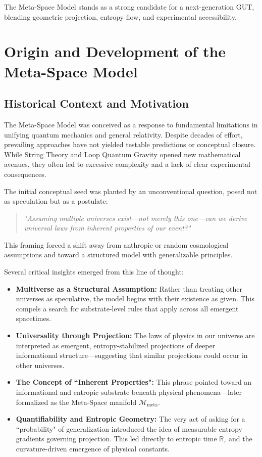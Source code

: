 \documentclass[10.5pt,a4paper]{article}
\begin{document}
The Meta-Space Model stands as a strong candidate for a next-generation GUT, blending geometric projection, entropy flow, and experimental accessibility.

\clearpage

\section{Origin and Development of the Meta-Space Model}
\subsection{Historical Context and Motivation}

The Meta-Space Model was conceived as a response to fundamental limitations in unifying quantum mechanics and general relativity. Despite decades of effort, prevailing approaches have not yielded testable predictions or conceptual closure. While String Theory and Loop Quantum Gravity opened new mathematical avenues, they often led to excessive complexity and a lack of clear experimental consequences.

The initial conceptual seed was planted by an unconventional question, posed not as speculation but as a postulate:
\begin{quote}
\emph{"Assuming multiple universes exist—not merely this one—can we derive universal laws from inherent properties of our event?"}
\end{quote}
This framing forced a shift away from anthropic or random cosmological assumptions and toward a structured model with generalizable principles.

Several critical insights emerged from this line of thought:
\begin{itemize}
    \item \textbf{Multiverse as a Structural Assumption:} Rather than treating other universes as speculative, the model begins with their existence as given. This compels a search for substrate-level rules that apply across all emergent spacetimes.
    
    \item \textbf{Universality through Projection:} The laws of physics in our universe are interpreted as emergent, entropy-stabilized projections of deeper informational structure—suggesting that similar projections could occur in other universes.
    
    \item \textbf{The Concept of ``Inherent Properties":} This phrase pointed toward an informational and entropic substrate beneath physical phenomena—later formalized as the Meta-Space manifold \( \mathcal{M}_{\text{meta}} \).
    
    \item \textbf{Quantifiability and Entropic Geometry:} The very act of asking for a ``probability" of generalization introduced the idea of measurable entropy gradients governing projection. This led directly to entropic time \( \mathbb{R}_\tau \) and the curvature-driven emergence of physical constants.
\end{itemize}
\end{document}
